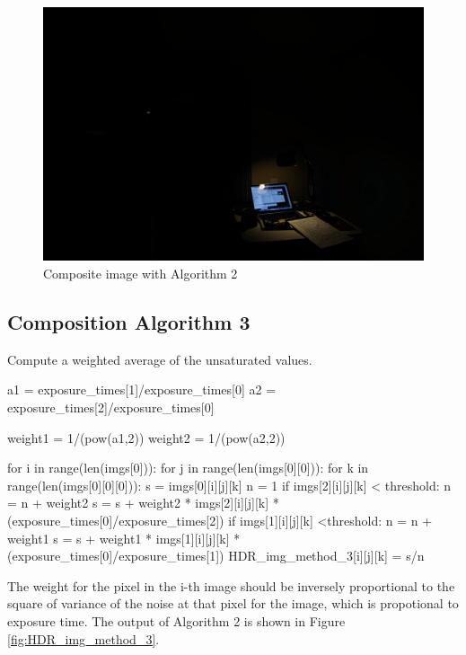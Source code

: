\documentclass[10pt,twocolumn,letterpaper]{article}
\begin{document}
\begin{figure}[bhp]
\includegraphics[width=\columnwidth]{images/hdr/combined/HDR_img_method_2}
\caption{Composite image with Algorithm 2}

\label{fig:HDR_img_method_2}
\end{figure}

\subsection{Composition Algorithm 3}
Compute a weighted average of the unsaturated values. \\
\begin{python} 
a1 = exposure_times[1]/exposure_times[0]
a2 = exposure_times[2]/exposure_times[0]

weight1 = 1/(pow(a1,2))
weight2 = 1/(pow(a2,2))

for i in  range(len(imgs[0])):
	for j in range(len(imgs[0][0])):
		for k in range(len(imgs[0][0][0])):
			s = imgs[0][i][j][k] 
			n = 1
			if imgs[2][i][j][k] < threshold:
				n = n + weight2
				s = s + weight2 * imgs[2][i][j][k] 
				* (exposure_times[0]/exposure_times[2])
			if imgs[1][i][j][k] <threshold:
				n = n + weight1
				s = s + weight1 * imgs[1][i][j][k] 
				* (exposure_times[0]/exposure_times[1])
			HDR_img_method_3[i][j][k] = s/n
\end{python}

The weight for the pixel in the i-th image should be inversely proportional to the square of variance of the noise at that pixel for the image, which is propotional to exposure time. The output of Algorithm 2 is shown in Figure \ref{fig:HDR_img_method_3}.
\end{document}
